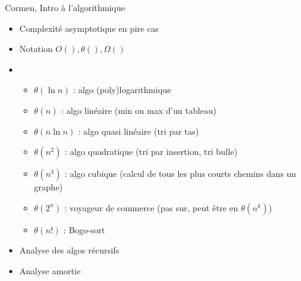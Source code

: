  Cormen, Intro à l'algorithmique \\

\begin{itemize}
	\item Complexité asymptotique en pire cas
	\item Notation $O(), \theta(), \Omega()$
	\item \begin{itemize}
		\item $\theta(\ln n)$ : algo (poly)logarithmique
		\item $\theta(n)$ : algo linéaire (min ou max d'un tableau)
		\item $\theta(n\ln n)$ : algo quasi linéaire (tri par tas)
		\item $\theta(n^2)$ : algo quadratique (tri par insertion, tri bulle)
		\item $\theta(n^3)$ : algo cubique (calcul de tous les plus courts chemins dans un graphe)
		\item $\theta(2^n)$ : voyageur de commerce (pas sur, peut être en $\theta(n^k)$)
		\item $\theta(n!)$ : Bogo-sort
	\end{itemize}
\end{itemize}

\begin{itemize}
	\item Analyse des algos récursifs
	\item Analyse amortie
\end{itemize}
